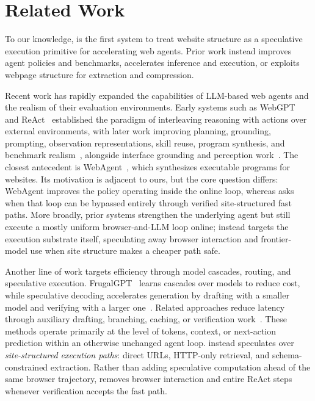 \section{Related Work}
\label{sec:related}

To our knowledge, \sys is the first system to treat website
structure as a speculative execution primitive for accelerating
web agents. Prior work instead improves agent
policies and benchmarks, accelerates inference and execution, or
exploits webpage structure for extraction and compression.

Recent work has rapidly expanded the capabilities of LLM-based
web agents and the realism of their evaluation environments.
Early systems such as WebGPT~\cite{webgpt} and
ReAct~\cite{react} established the paradigm of interleaving
reasoning with actions over external environments, with later
work improving planning, grounding, prompting, observation
representations, skill reuse, program synthesis, and benchmark
realism~\cite{webagent,mind2web,webshop,webarena,weblinx,webvoyager,gaia,odysseys,webxskill,seeact,agentoccam,molmoweb,browseruse},
alongside interface grounding and perception
work~\cite{showui,uground,pixels2uiactions}. The closest
antecedent is WebAgent~\cite{webagent}, which synthesizes
executable programs for websites.
Its motivation is adjacent to ours, but the core question
differs: WebAgent improves the policy operating inside the online
loop, whereas \sys asks when that loop can be bypassed entirely
through verified site-structured fast paths. More broadly, prior
systems strengthen the underlying agent but still execute a
mostly uniform browser-and-LLM loop online; \sys instead targets
the execution substrate itself, speculating away browser
interaction and frontier-model use when site structure makes a
cheaper path safe.

Another line of work targets efficiency through model cascades,
routing, and speculative execution. FrugalGPT~\cite{frugalgpt}
learns cascades over models to reduce cost, while speculative
decoding accelerates generation by drafting with a smaller model
and verifying with a larger one~\cite{speculative_decoding}.
Related approaches reduce latency through auxiliary drafting,
branching, caching, or verification
work~\cite{contextbudget,readmorethinkmore,dsp,speculative_actions,speccache}.
These methods operate primarily at the level of tokens, context,
or next-action prediction within an otherwise unchanged agent
loop. \sys instead speculates over \emph{site-structured
execution paths}: direct URLs, HTTP-only retrieval, and
schema-constrained extraction. Rather than adding speculative
computation ahead of the same browser trajectory, \sys removes
browser interaction and entire ReAct steps whenever verification
accepts the fast path.


